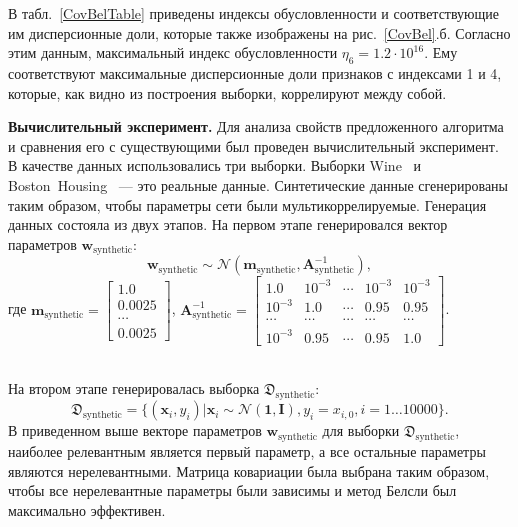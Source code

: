 В табл.~\ref{CovBelTable} приведены индексы обусловленности и соответствующие им дисперсионные доли, которые также изображены на рис.~\ref{CovBel}.б. Согласно этим данным, максимальный индекс обусловленности $\eta_6 = 1.2\cdot 10^{16}$. Ему соответствуют максимальные дисперсионные доли признаков с индексами 1 и 4, которые, как видно из построения выборки, коррелируют между собой.


\textbf{Вычислительный эксперимент. }
Для анализа свойств предложенного алгоритма и сравнения его с существующими был проведен вычислительный эксперимент.
В качестве данных использовались три выборки. Выборки Wine~\cite{wine} и Boston~Housing~\cite{boston}  --- это реальные данные. Синтетические данные сгенерированы таким образом, чтобы параметры сети были мультикоррелируемые. Генерация данных состояла из двух этапов. 
На первом этапе генерировался вектор параметров $\mathbf{w}_{\text{synthetic}}$:
$$\mathbf{w}_{\text{synthetic}}  \sim \mathcal{N}(\textbf{m}_{\text{synthetic}}, \textbf{A}^{-1}_{\text{synthetic}}),$$ 
где 
$\textbf{m}_{\text{synthetic}} = \begin{bmatrix}
1.0\\
0.0025\\
\cdots\\
0.0025
\end{bmatrix}$,
$\textbf{A}^{-1}_{\text{synthetic}} = \begin{bmatrix}
1.0& 10^{-3}& \cdots& 10^{-3}& 10^{-3}\\
10^{-3}& 1.0& \cdots& 0.95& 0.95\\
\cdots&\cdots&\cdots&\cdots&\cdots\\
10^{-3}& 0.95& \cdots& 0.95& 1.0
\end{bmatrix}$.


~\\На втором этапе генерировалась выборка $\mathfrak{D}_{\text{synthetic}}$:
$$\mathfrak{D}_{\text{synthetic}} = \{(\textbf{x}_i,y_i)| \textbf{x}_i \sim  \mathcal{N}(\textbf{1}, \textbf{I}), y_i = x_{i,0}, i = 1 \dots 10000\}.$$
В приведенном выше векторе параметров $\mathbf{w}_{\text{synthetic}}$ для выборки $\mathfrak{D}_{\text{synthetic}}$, наиболее релевантным является первый параметр, а все остальные параметры являются нерелевантными. Матрица ковариации была выбрана таким образом, чтобы все нерелевантные параметры были зависимы и метод Белсли был максимально эффективен.



